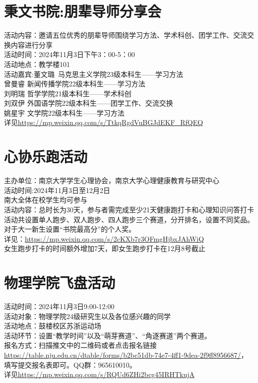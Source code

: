 \documentclass[letterpaper, 12pt]{article}
\begin{document}
\begin{multicols}{2}
\section{秉文书院:朋辈导师分享会}
活动内容：邀请五位优秀的朋辈导师围绕学习方法、学术科创、团学工作、交流交换内容进行分享\\
活动时间：2024年11月3日下午3：00-5：00\\
活动地点：教学楼101\\
活动嘉宾:董文璐 马克思主义学院23级本科生——学习方法\\
曾曼睿 新闻传播学院22级本科生——学习方法\\
刘明瑞 哲学学院21级本科生——学术科创\\
刘双伊 外国语学院22级本科生——团学工作、交流交换\\
姚星宇 文学院22级本科生——学习方法\\
详见\url{https://mp.weixin.qq.com/s/TtkqRgdVuBGJdEKF_RfQEQ}

\section{心协乐跑活动}
主办单位：南京大学学生心理协会，南京大学心理健康教育与研究中心\\
活动时间:2024年11月3日至12月2日\\
南大全体在校学生均可参与\\
活动内容：总时长为30天，参与者需完成至少21天健康跑打卡和心理知识问答打卡
活动共设置单人跑步、双人跑步、四人跑步三个赛道，分开排名，设置不同奖品。对于大一新生设置“书院最高分”的个人奖。\\
详见：\url{https://mp.weixin.qq.com/s/2cKXb7r3OFmgHjbxJAhWiQ}\\
女生跑步打卡的时间额外增加7天，即女生跑步打卡在12月8号截止

\section{物理学院飞盘活动}
活动时间：2024年11月3日9:00-12:00\\
活动对象：物理学院24级研究生以及各位感兴趣的同学\\
活动地点：鼓楼校区苏浙运动场\\
活动环节：设置“教学时间”以及“萌芽赛道”、“角逐赛道”两个赛道。\\
报名方式：扫描推文中的二维码或者点击报名链接\url{https://table.nju.edu.cn/dtable/forms/b2bc51db-74e7-4ff1-9dea-2f9ff8956687/}，填写提交报名表即可。QQ群：965610010。\\
详见\url{https://mp.weixin.qq.com/s/RQUd6ZHi2bcg45IRHTkujA}



\end{multicols}
\end{document}
